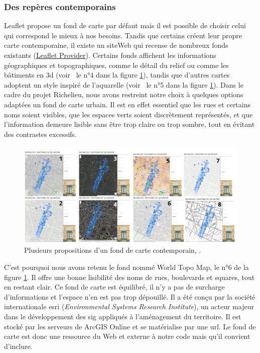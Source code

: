\subsubsection{Des repères contemporains}
Leaflet propose un fond de carte par défaut mais il est possible de choisir celui qui correspond le mieux à nos besoins. Tandis que certains créent leur propre carte contemporaine, il existe un siteWeb qui recense de nombreux fonds existants (\href{https://leaflet-extras.github.io/leaflet-providers/preview/}{Leaflet Provider}). Certains fonds affichent les informations géographiques et topographiques, comme le détail du relief ou comme les bâtiments en \acrshort{3d} (voir~ le n°4 dans la figure \ref{fig:fond-carte-contemporain}), tandis que d'autres cartes adoptent un style inspiré de l'aquarelle (voir~ le n°5 dans la figure \ref{fig:fond-carte-contemporain}). Dans le cadre du projet Richelieu, nous avons restreint notre choix à quelques options adaptées un fond de carte urbain. Il est en effet essentiel que les rues et certains noms soient visibles, que les espaces verts soient discrètement représentés, et que l'information demeure lisible sans être trop claire ou trop sombre, tout en évitant des contrastes excessifs. 
\begin{figure}[h!]
    \centering
    \includegraphics[width=1\linewidth]{images/fond-de-carte-contempo.png}
    \caption{Plusieurs propositions d'un fond de carte contemporain, \mhd.}
    \label{fig:fond-carte-contemporain}
\end{figure}
C'est pourquoi nous avons retenu le fond nommé World Topo Map, le n°6 de la figure \ref{fig:fond-carte-contemporain}. Il offre une bonne lisibilité des noms de rues, boulevards et squares, tout en restant clair. Ce fond de carte est équilibré, il n'y a pas de surcharge d'informations et l'espace n'en est pas trop dépouillé. Il a été conçu par la société internationale \acrshort{esri} (\textit{Environmental Systems Research Institute}), un acteur majeur dans le développement des  \acrshort{sig} appliqués à l'aménagement du territoire. Il est stocké par les serveurs de ArcGIS Online et se matérialise par une \acrshort{url}. Le fond de carte est donc une ressource du Web et externe à notre code mais qu'il convient d'inclure. 

